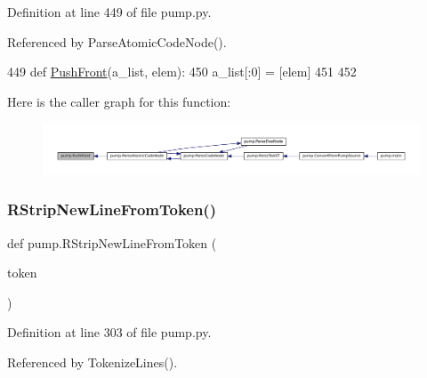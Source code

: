 Definition at line 449 of file pump.\+py.



Referenced by Parse\+Atomic\+Code\+Node().


\begin{DoxyCode}
449 \textcolor{keyword}{def }\hyperlink{namespacepump_a12c70577eb727526ac0ad17bf3b6c3a4}{PushFront}(a\_list, elem):
450   a\_list[:0] = [elem]
451 
452 
\end{DoxyCode}
Here is the caller graph for this function\+:
\nopagebreak
\begin{figure}[H]
\begin{center}
\leavevmode
\includegraphics[width=350pt]{namespacepump_a12c70577eb727526ac0ad17bf3b6c3a4_icgraph}
\end{center}
\end{figure}
\mbox{\label{namespacepump_ae07150d94399cbe1661abe5929f921e0}} 
\subsubsection{\texorpdfstring{R\+Strip\+New\+Line\+From\+Token()}{RStripNewLineFromToken()}}
{\footnotesize\ttfamily def pump.\+R\+Strip\+New\+Line\+From\+Token (\begin{DoxyParamCaption}\item[{}]{token }\end{DoxyParamCaption})}



Definition at line 303 of file pump.\+py.



Referenced by Tokenize\+Lines().


